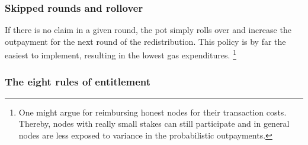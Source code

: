\subsubsection{Skipped rounds and rollover}

If there is no claim in a given round, the pot simply rolls over and increase the outpayment for the next round of the redistribution. This policy is by far the easiest to implement, resulting in the lowest gas expenditures.%
%
\footnote{One might argue for reimbursing honest nodes for their transaction costs. Thereby,  nodes with really small stakes can still participate and in general nodes are less exposed to variance in the probabilistic outpayments.}

\subsubsection{The eight rules of entitlement}

